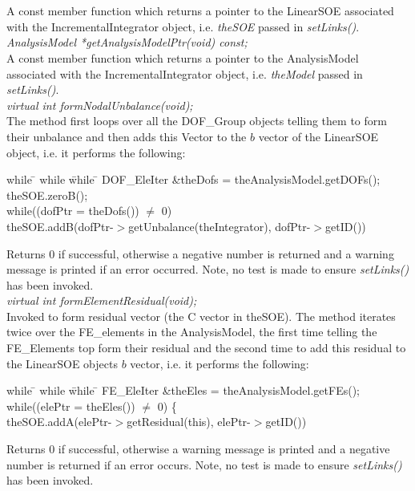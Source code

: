   \\
 \\
A const member function which returns a pointer to the LinearSOE
associated with the IncrementalIntegrator object, i.e. {\em theSOE}
passed in {\em setLinks()}. \\

{\em AnalysisModel *getAnalysisModelPtr(void) const;} \\
A const member function which returns a pointer to the AnalysisModel
associated with the IncrementalIntegrator object, i.e. {\em theModel}
passed in {\em setLinks()}. \\


{\em virtual int formNodalUnbalance(void);} \\
The method first
loops over all the DOF\_Group objects telling them to form their
unbalance and then adds this Vector to the $b$ vector of the LinearSOE
object, i.e. it performs the following: \\
\begin{tabbing}
while \= \+ while \= while \= \kill
DOF\_EleIter \&theDofs = theAnalysisModel.getDOFs();\\
theSOE.zeroB();\\
while((dofPtr = theDofs()) $\neq$ 0) \+ \\
theSOE.addB(dofPtr-$>$getUnbalance(theIntegrator),
dofPtr-$>$getID()) \\
\end{tabbing}
\noindent Returns $0$ if successful, otherwise a  negative number is
returned and a warning message is printed if an error occurred. Note,
no test is made to ensure {\em setLinks()} has been invoked.\\


{\em virtual int formElementResidual(void);} \\
Invoked to form residual vector (the C vector in theSOE). The method
iterates twice over the FE\_elements in the AnalysisModel, the first
time telling the FE\_Elements top form their residual and the second
time to add this residual to the LinearSOE objects $b$ vector, i.e. it
performs the following:
\begin{tabbing}
while \= \+ while \= while \= \kill
FE\_EleIter \&theEles = theAnalysisModel.getFEs();\\
while((elePtr = theEles()) $\neq$ 0) \{ \+ \\
theSOE.addA(elePtr-$>$getResidual(this), elePtr-$>$getID()) \+ \\ 
\end{tabbing}
\noindent Returns $0$ if successful, otherwise a warning message is
printed and a negative number is returned if an error occurs. Note, no
test is made to ensure {\em setLinks()} has been invoked.\\




